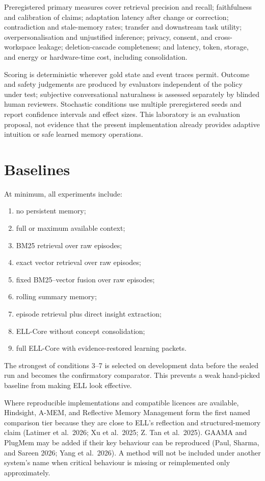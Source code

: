 \documentclass[
  english,
  a4paper,
  DIV=11,
  numbers=noendperiod]{scrreprt}
\providecommand{\tightlist}{%
  \setlength{\itemsep}{0pt}\setlength{\parskip}{0pt}}
\begin{document}
Preregistered primary measures cover retrieval precision and recall;
faithfulness and calibration of claims; adaptation latency after change
or correction; contradiction and stale-memory rates; transfer and
downstream task utility; overpersonalisation and unjustified inference;
privacy, consent, and cross-workspace leakage; deletion-cascade
completeness; and latency, token, storage, and energy or hardware-time
cost, including consolidation.

Scoring is deterministic wherever gold state and event traces permit.
Outcome and safety judgements are produced by evaluators independent of
the policy under test; subjective conversational naturalness is assessed
separately by blinded human reviewers. Stochastic conditions use
multiple preregistered seeds and report confidence intervals and effect
sizes. This laboratory is an evaluation proposal, not evidence that the
present implementation already provides adaptive intuition or safe
learned memory operations.

\section{Baselines}\label{baselines}

At minimum, all experiments include:

\begin{enumerate}
\def\labelenumi{\arabic{enumi}.}
\tightlist
\item
  no persistent memory;
\item
  full or maximum available context;
\item
  BM25 retrieval over raw episodes;
\item
  exact vector retrieval over raw episodes;
\item
  fixed BM25--vector fusion over raw episodes;
\item
  rolling summary memory;
\item
  episode retrieval plus direct insight extraction;
\item
  ELL-Core without concept consolidation;
\item
  full ELL-Core with evidence-restored learning packets.
\end{enumerate}

The strongest of conditions 3--7 is selected on development data before
the sealed run and becomes the confirmatory comparator. This prevents a
weak hand-picked baseline from making ELL look effective.

Where reproducible implementations and compatible licences are
available, Hindsight, A-MEM, and Reflective Memory Management form the
first named comparison tier because they are close to ELL's reflection
and structured-memory claim (Latimer et al.~2026; Xu et al.~2025; Z. Tan
et al.~2025). GAAMA and PlugMem may be added if their key behaviour can
be reproduced (Paul, Sharma, and Sareen 2026; Yang et al.~2026). A
method will not be included under another system's name when critical
behaviour is missing or reimplemented only approximately.
\end{document}
